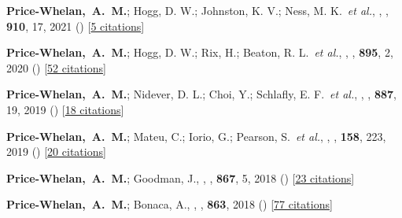 \item[{\color{deemph}\scriptsize18}]\textbf{Price-Whelan,~A.~M.}; Hogg, D. W.; Johnston, K. V.; Ness, M. K.~\textit{et al.}, , \apj, \textbf{910}, 17, 2021 () [\href{http://adsabs.harvard.edu/abs/2021ApJ...910...17P}{5 citations}]

\item[{\color{deemph}\scriptsize17}]\textbf{Price-Whelan,~A.~M.}; Hogg, D. W.; Rix, H.; Beaton, R. L.~\textit{et al.}, , \apj, \textbf{895}, 2, 2020 () [\href{http://adsabs.harvard.edu/abs/2020ApJ...895....2P}{52 citations}]

\item[{\color{deemph}\scriptsize16}]\textbf{Price-Whelan,~A.~M.}; Nidever, D. L.; Choi, Y.; Schlafly, E. F.~\textit{et al.}, , \apj, \textbf{887}, 19, 2019 () [\href{http://adsabs.harvard.edu/abs/2019ApJ...887...19P}{18 citations}]

\item[{\color{deemph}\scriptsize15}]\textbf{Price-Whelan,~A.~M.}; Mateu, C.; Iorio, G.; Pearson, S.~\textit{et al.}, , \aj, \textbf{158}, 223, 2019 () [\href{http://adsabs.harvard.edu/abs/2019AJ....158..223P}{20 citations}]

\item[{\color{deemph}\scriptsize14}]\textbf{Price-Whelan,~A.~M.}; Goodman, J., , \apj, \textbf{867}, 5, 2018 () [\href{http://adsabs.harvard.edu/abs/2018ApJ...867....5P}{23 citations}]

\item[{\color{deemph}\scriptsize13}]\textbf{Price-Whelan,~A.~M.}; Bonaca, A., , \apj, \textbf{863}, 2018 () [\href{http://adsabs.harvard.edu/abs/2018ApJ...863L..20P}{77 citations}]

